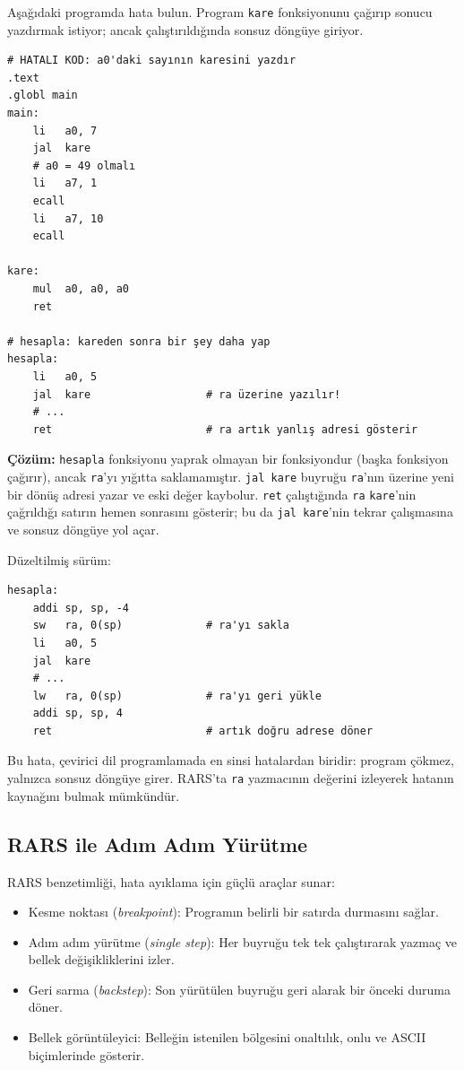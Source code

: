 \begin{ornek}[4.24]
\label{orn:hata-ra}
Aşağıdaki programda hata bulun. Program \texttt{kare} fonksiyonunu çağırıp sonucu yazdırmak istiyor; ancak çalıştırıldığında sonsuz döngüye giriyor.

\begin{lstlisting}[style=riscv]
# HATALI KOD: a0'daki sayının karesini yazdır
.text
.globl main
main:
    li   a0, 7
    jal  kare
    # a0 = 49 olmalı
    li   a7, 1
    ecall
    li   a7, 10
    ecall

kare:
    mul  a0, a0, a0
    ret

# hesapla: kareden sonra bir şey daha yap
hesapla:
    li   a0, 5
    jal  kare                  # ra üzerine yazılır!
    # ...
    ret                        # ra artık yanlış adresi gösterir
\end{lstlisting}

\textbf{Çözüm:} \texttt{hesapla} fonksiyonu yaprak olmayan bir fonksiyondur (başka fonksiyon çağırır), ancak \texttt{ra}'yı yığıtta saklamamıştır. \texttt{jal kare} buyruğu \texttt{ra}'nın üzerine yeni bir dönüş adresi yazar ve eski değer kaybolur. \texttt{ret} çalıştığında \texttt{ra} \texttt{kare}'nin çağrıldığı satırın hemen sonrasını gösterir; bu da \texttt{jal kare}'nin tekrar çalışmasına ve sonsuz döngüye yol açar.

Düzeltilmiş sürüm:

\begin{lstlisting}[style=riscv]
hesapla:
    addi sp, sp, -4
    sw   ra, 0(sp)             # ra'yı sakla
    li   a0, 5
    jal  kare
    # ...
    lw   ra, 0(sp)             # ra'yı geri yükle
    addi sp, sp, 4
    ret                        # artık doğru adrese döner
\end{lstlisting}

Bu hata, çevirici dil programlamada en sinsi hatalardan biridir: program çökmez, yalnızca sonsuz döngüye girer. RARS'ta \texttt{ra} yazmacının değerini izleyerek hatanın kaynağını bulmak mümkündür.
\end{ornek}

\subsection{RARS ile Adım Adım Yürütme}
\label{subsec:rars-hata-ayiklama}

RARS benzetimliği, hata ayıklama için güçlü araçlar sunar:

\begin{itemize}
\item Kesme noktası (\emph{breakpoint}): Programın belirli bir satırda durmasını sağlar.
\item Adım adım yürütme (\emph{single step}): Her buyruğu tek tek çalıştırarak yazmaç ve bellek değişikliklerini izler.
\item Geri sarma (\emph{backstep}): Son yürütülen buyruğu geri alarak bir önceki duruma döner.
\item Bellek görüntüleyici: Belleğin istenilen bölgesini onaltılık, onlu ve ASCII biçimlerinde gösterir.
\end{itemize}

